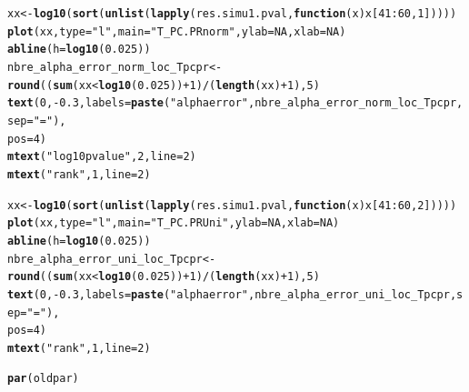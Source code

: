 \documentclass[12pt]{article}\usepackage[]{graphicx}\usepackage[]{color}
\makeatletter
\newcommand{\hlnum}[1]{\textcolor[rgb]{0.686,0.059,0.569}{#1}}%
\newcommand{\hlstr}[1]{\textcolor[rgb]{0.192,0.494,0.8}{#1}}%
\newcommand{\hlopt}[1]{\textcolor[rgb]{0,0,0}{#1}}%
\newcommand{\hlstd}[1]{\textcolor[rgb]{0.345,0.345,0.345}{#1}}%
\newcommand{\hlkwa}[1]{\textcolor[rgb]{0.161,0.373,0.58}{\textbf{#1}}}%
\newcommand{\hlkwb}[1]{\textcolor[rgb]{0.69,0.353,0.396}{#1}}%
\newcommand{\hlkwc}[1]{\textcolor[rgb]{0.333,0.667,0.333}{#1}}%
\newcommand{\hlkwd}[1]{\textcolor[rgb]{0.737,0.353,0.396}{\textbf{#1}}}%
\newenvironment{kframe}{%
 \def\at@end@of@kframe{}%
 \ifinner\ifhmode%
  \def\at@end@of@kframe{\end{minipage}}%
  \begin{minipage}{\columnwidth}%
 \fi\fi%
 \def\FrameCommand##1{\hskip\@totalleftmargin \hskip-\fboxsep
 \colorbox{shadecolor}{##1}\hskip-\fboxsep
     \hskip-\linewidth \hskip-\@totalleftmargin \hskip\columnwidth}%
 \MakeFramed {\advance\hsize-\width
   \@totalleftmargin\z@ \linewidth\hsize
   \@setminipage}}%
 {\par\unskip\endMakeFramed%
 \at@end@of@kframe}
\newenvironment{knitrout}{}{} %
\makeatother
\begin{document}
\begin{landscape}
\begin{knitrout}
\begin{kframe}
\begin{alltt}
\hlstd{xx} \hlkwb{<-} \hlkwd{log10}\hlstd{(}\hlkwd{sort}\hlstd{(}\hlkwd{unlist}\hlstd{(}\hlkwd{lapply}\hlstd{(res.simu1.pval,} \hlkwa{function}\hlstd{(}\hlkwc{x}\hlstd{) x[}\hlnum{41}\hlopt{:}\hlnum{60}\hlstd{,} \hlnum{1}\hlstd{]))))}
\hlkwd{plot}\hlstd{(xx,} \hlkwc{type} \hlstd{=} \hlstr{"l"}\hlstd{,} \hlkwc{main} \hlstd{=} \hlstr{"T_PC.PR norm"}\hlstd{,} \hlkwc{ylab} \hlstd{=} \hlnum{NA}\hlstd{,} \hlkwc{xlab} \hlstd{=} \hlnum{NA}\hlstd{)}
\hlkwd{abline}\hlstd{(}\hlkwc{h} \hlstd{=} \hlkwd{log10}\hlstd{(}\hlnum{0.025}\hlstd{))}
\hlstd{nbre_alpha_error_norm_loc_Tpcpr} \hlkwb{<-} \hlkwd{round}\hlstd{((}\hlkwd{sum}\hlstd{(xx} \hlopt{<} \hlkwd{log10}\hlstd{(}\hlnum{0.025}\hlstd{))} \hlopt{+}\hlnum{1} \hlstd{)} \hlopt{/} \hlstd{(}\hlkwd{length}\hlstd{(xx)}\hlopt{+}\hlnum{1}\hlstd{),} \hlnum{5}\hlstd{)}
\hlkwd{text}\hlstd{(}\hlnum{0}\hlstd{,} \hlopt{-}\hlnum{0.3}\hlstd{,} \hlkwc{labels} \hlstd{=} \hlkwd{paste}\hlstd{(}\hlstr{"alpha error"}\hlstd{, nbre_alpha_error_norm_loc_Tpcpr,} \hlkwc{sep} \hlstd{=} \hlstr{" = "}\hlstd{),}
     \hlkwc{pos} \hlstd{=} \hlnum{4}\hlstd{)}
\hlkwd{mtext}\hlstd{(}\hlstr{"log10 pvalue"}\hlstd{,} \hlnum{2}\hlstd{,} \hlkwc{line} \hlstd{=} \hlnum{2}\hlstd{)}
\hlkwd{mtext}\hlstd{(}\hlstr{"rank"}\hlstd{,} \hlnum{1}\hlstd{,} \hlkwc{line} \hlstd{=} \hlnum{2}\hlstd{)}

\hlstd{xx} \hlkwb{<-} \hlkwd{log10}\hlstd{(}\hlkwd{sort}\hlstd{(}\hlkwd{unlist}\hlstd{(}\hlkwd{lapply}\hlstd{(res.simu1.pval,} \hlkwa{function}\hlstd{(}\hlkwc{x}\hlstd{) x[}\hlnum{41}\hlopt{:}\hlnum{60}\hlstd{,} \hlnum{2}\hlstd{]))))}
\hlkwd{plot}\hlstd{(xx,} \hlkwc{type} \hlstd{=} \hlstr{"l"}\hlstd{,} \hlkwc{main} \hlstd{=} \hlstr{"T_PC.PR Uni"}\hlstd{,} \hlkwc{ylab} \hlstd{=} \hlnum{NA}\hlstd{,} \hlkwc{xlab} \hlstd{=} \hlnum{NA}\hlstd{)}
\hlkwd{abline}\hlstd{(}\hlkwc{h} \hlstd{=} \hlkwd{log10}\hlstd{(}\hlnum{0.025}\hlstd{))}
\hlstd{nbre_alpha_error_uni_loc_Tpcpr} \hlkwb{<-} \hlkwd{round}\hlstd{((}\hlkwd{sum}\hlstd{(xx} \hlopt{<} \hlkwd{log10}\hlstd{(}\hlnum{0.025}\hlstd{))} \hlopt{+}\hlnum{1} \hlstd{)} \hlopt{/} \hlstd{(}\hlkwd{length}\hlstd{(xx)}\hlopt{+}\hlnum{1}\hlstd{),} \hlnum{5}\hlstd{)}
\hlkwd{text}\hlstd{(}\hlnum{0}\hlstd{,} \hlopt{-}\hlnum{0.3}\hlstd{,} \hlkwc{labels} \hlstd{=} \hlkwd{paste}\hlstd{(}\hlstr{"alpha error"}\hlstd{, nbre_alpha_error_uni_loc_Tpcpr,} \hlkwc{sep} \hlstd{=} \hlstr{" = "}\hlstd{),}
     \hlkwc{pos} \hlstd{=} \hlnum{4}\hlstd{)}
\hlkwd{mtext}\hlstd{(}\hlstr{"rank"}\hlstd{,} \hlnum{1}\hlstd{,} \hlkwc{line} \hlstd{=} \hlnum{2}\hlstd{)}

\hlkwd{par}\hlstd{(oldpar)}
\end{alltt}
\end{kframe}\begin{figure}


\end{figure}
\end{knitrout}
\end{landscape}
\end{document}
